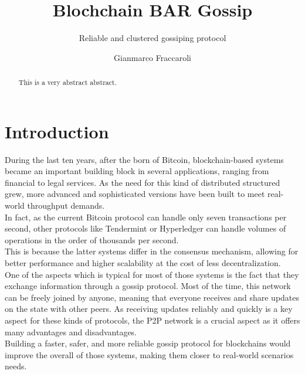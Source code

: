 \documentclass[mscthesis]{usiinfthesis}
\title{Blochchain BAR Gossip} %
\subtitle{Reliable and clustered gossiping protocol} %
\author{Gianmarco Fraccaroli} %
\begin{document}
\maketitle %

\frontmatter %

\begin{abstract}
This is a very abstract abstract. 
\end{abstract}



\begin{acknowledgements}
\end{acknowledgements}

\tableofcontents 
\listoffigures 
\listoftables %

\mainmatter

\chapter{Introduction}
During the last ten years, after the born of Bitcoin, blockchain-based systems became an important building block in several applications, ranging from financial to legal services. As the need for this kind of distributed structured grew, more advanced and sophisticated versions have been built to meet real-world throughput demands. \\
In fact, as the current Bitcoin protocol can handle only seven transactions per second, other protocols like Tendermint or Hyperledger can handle volumes of operations in the order of thousands per second. \\
This is because the latter systems differ in the consensus mechanism, allowing for better performance and higher scalability at the cost of less decentralization. \\
One of the aspects which is typical for most of those systems is the fact that they exchange information through a gossip protocol. Most of the time, this network can be freely joined by anyone, meaning that everyone receives and share updates on the state with other peers. 
As receiving updates reliably and quickly is a key aspect for these kinds of protocols, the P2P network is a crucial aspect as it offers many advantages and disadvantages. \\
Building a faster, safer, and more reliable gossip protocol for blockchains would improve the overall of those systems, making them closer to real-world scenarios needs.
\end{document}
